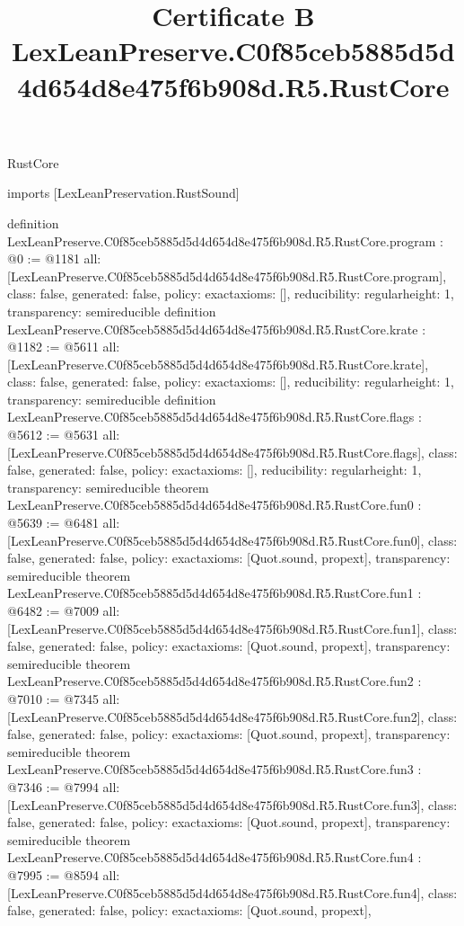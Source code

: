 \begin{lexlean}{RustCore}
\title{Certificate B LexLeanPreserve.C0f85ceb5885d5d4d654d8e475f6b908d.R5.RustCore}
\begin{coremodule}
imports [LexLeanPreservation.RustSound]

definition LexLeanPreserve.C0f85ceb5885d5d4d654d8e475f6b908d.R5.RustCore.program : @0 := @1181 {
  all: [LexLeanPreserve.C0f85ceb5885d5d4d654d8e475f6b908d.R5.RustCore.program],
  class: false,
  generated: false,
  policy: exact{axioms: []},
  reducibility: regular{height: 1},
  transparency: semireducible
}
definition LexLeanPreserve.C0f85ceb5885d5d4d654d8e475f6b908d.R5.RustCore.krate : @1182 := @5611 {
  all: [LexLeanPreserve.C0f85ceb5885d5d4d654d8e475f6b908d.R5.RustCore.krate],
  class: false,
  generated: false,
  policy: exact{axioms: []},
  reducibility: regular{height: 1},
  transparency: semireducible
}
definition LexLeanPreserve.C0f85ceb5885d5d4d654d8e475f6b908d.R5.RustCore.flags : @5612 := @5631 {
  all: [LexLeanPreserve.C0f85ceb5885d5d4d654d8e475f6b908d.R5.RustCore.flags],
  class: false,
  generated: false,
  policy: exact{axioms: []},
  reducibility: regular{height: 1},
  transparency: semireducible
}
theorem LexLeanPreserve.C0f85ceb5885d5d4d654d8e475f6b908d.R5.RustCore.fun0 : @5639 := @6481 {
  all: [LexLeanPreserve.C0f85ceb5885d5d4d654d8e475f6b908d.R5.RustCore.fun0],
  class: false,
  generated: false,
  policy: exact{axioms: [Quot.sound, propext]},
  transparency: semireducible
}
theorem LexLeanPreserve.C0f85ceb5885d5d4d654d8e475f6b908d.R5.RustCore.fun1 : @6482 := @7009 {
  all: [LexLeanPreserve.C0f85ceb5885d5d4d654d8e475f6b908d.R5.RustCore.fun1],
  class: false,
  generated: false,
  policy: exact{axioms: [Quot.sound, propext]},
  transparency: semireducible
}
theorem LexLeanPreserve.C0f85ceb5885d5d4d654d8e475f6b908d.R5.RustCore.fun2 : @7010 := @7345 {
  all: [LexLeanPreserve.C0f85ceb5885d5d4d654d8e475f6b908d.R5.RustCore.fun2],
  class: false,
  generated: false,
  policy: exact{axioms: [Quot.sound, propext]},
  transparency: semireducible
}
theorem LexLeanPreserve.C0f85ceb5885d5d4d654d8e475f6b908d.R5.RustCore.fun3 : @7346 := @7994 {
  all: [LexLeanPreserve.C0f85ceb5885d5d4d654d8e475f6b908d.R5.RustCore.fun3],
  class: false,
  generated: false,
  policy: exact{axioms: [Quot.sound, propext]},
  transparency: semireducible
}
theorem LexLeanPreserve.C0f85ceb5885d5d4d654d8e475f6b908d.R5.RustCore.fun4 : @7995 := @8594 {
  all: [LexLeanPreserve.C0f85ceb5885d5d4d654d8e475f6b908d.R5.RustCore.fun4],
  class: false,
  generated: false,
  policy: exact{axioms: [Quot.sound, propext]},
}
\end{coremodule}
\end{lexlean}
